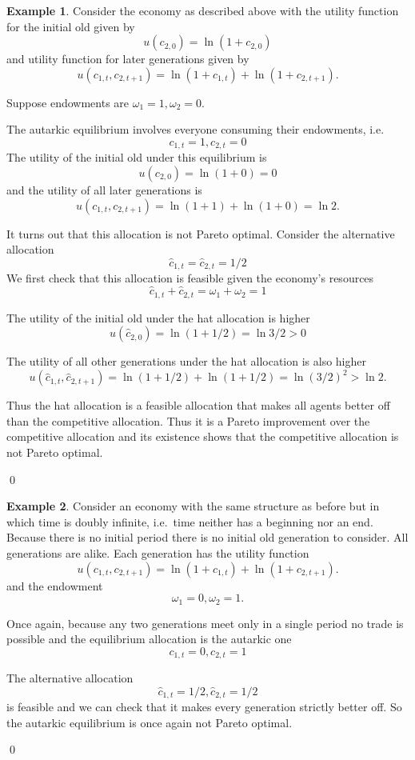 \documentclass[12pt,reqno,openany]{amsbook}
\theoremstyle{plain}
\theoremstyle{definition}
\newtheorem{exmp}{Example}[chapter]
\begin{document}
\begin{exmp}\label{exmp:olg-np-single}
Consider the economy as described above with the utility function
for the initial old given by
\[u(c_{2,0})=\ln(1+c_{2,0})\]
and utility function for later generations given by
\[u(c_{1,t},c_{2,t+1})=\ln(1+c_{1,t})+\ln(1+c_{2,t+1}).\]

Suppose endowments are $\omega_1=1,\omega_2=0$.

The autarkic equilibrium involves everyone consuming their endowments,
i.e.
\[c_{1,t}=1, c_{2,t}=0\]
The utility of the initial old under this equilibrium is
\[u(c_{2,0})=\ln (1+0)=0\]
and the utility of all later generations is
\[u(c_{1,t},c_{2,t+1})=\ln(1+1)+\ln(1+0)=\ln 2.\]

It turns out that this allocation is not Pareto optimal. Consider the
alternative allocation
\[\hat c_{1,t}=\hat c_{2,t}=1/2\]
We first check that this allocation is feasible given the economy's
resources
\[\hat c_{1,t}+\hat c_{2,t}=\omega_1+\omega_2=1\]

The utility of the initial old under the hat allocation is higher
\[u(\hat c_{2,0})=\ln (1+1/2) = \ln 3/2 >0\]

The utility of all other generations under the hat allocation is also
higher
\[u(\hat c_{1,t},\hat c_{2,t+1})=\ln (1+1/2)+\ln(1+1/2)=\ln (3/2)^2 >
\ln 2.\]

Thus the hat allocation is a feasible allocation that makes all agents
better off than the competitive allocation. Thus it is a Pareto
improvement over the competitive allocation and its existence shows
that the competitive allocation is not Pareto optimal.

\qed
\end{exmp}

\begin{exmp}\label{exmp:olg-np-double}
Consider an economy with the same structure as before but in which
time is doubly infinite, i.e.\ time neither has a beginning nor an
end. Because there is no initial period there is no initial old
generation to consider. All generations are alike. Each generation has
the utility function
\[u(c_{1,t},c_{2,t+1})=\ln(1+c_{1,t})+\ln(1+c_{2,t+1}).\]
and the endowment
\[\omega_1=0, \omega_2=1.\]

Once again, because any two generations meet only in a single period
no trade is possible and the equilibrium allocation is the autarkic
one
\[c_{1,t}=0, c_{2,t}=1\]

The alternative allocation
\[\hat c_{1,t}=1/2, \hat c_{2,t}=1/2\]
is feasible and we can check that it makes every generation strictly
better off. So the autarkic equilibrium is once again not Pareto
optimal.

\qed
\end{exmp}
\end{document}

